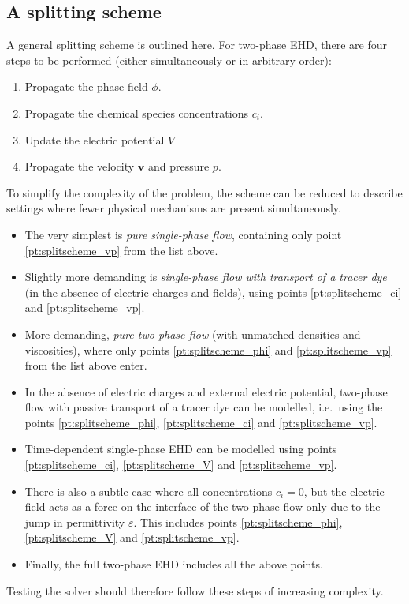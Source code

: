 \documentclass[preprint,pre,superscriptaddress,a4paper]{revtex4-1}
\renewcommand{\v}[1]{\ensuremath{\mathbf{#1}}} %
\begin{document}
\subsection{A splitting scheme}
A general splitting scheme is outlined here.
For two-phase EHD, there are four steps to be performed (either simultaneously or in arbitrary order):
\begin{enumerate}
\item Propagate the phase field $\phi$. \label{pt:splitscheme_phi}
\item Propagate the chemical species concentrations $c_i$. \label{pt:splitscheme_ci}
\item Update the electric potential $V$ \label{pt:splitscheme_V}
\item Propagate the velocity $\v v$ and pressure $p$. \label{pt:splitscheme_vp}
\end{enumerate}
To simplify the complexity of the problem, the scheme can be reduced to describe settings where fewer physical mechanisms are present simultaneously.
\begin{itemize}
\item The very simplest is \emph{pure single-phase flow}, containing only point \ref{pt:splitscheme_vp} from the list above.
\item Slightly more demanding is \emph{single-phase flow with transport of a tracer dye} (in the absence of electric charges and fields), using points \ref{pt:splitscheme_ci} and \ref{pt:splitscheme_vp}.
\item More demanding, \emph{pure two-phase flow} (with unmatched densities and viscosities), where only points \ref{pt:splitscheme_phi} and \ref{pt:splitscheme_vp} from the list above enter.
\item In the absence of electric charges and external electric potential, two-phase flow with passive transport of a tracer dye can be modelled, i.e.~using the points \ref{pt:splitscheme_phi}, \ref{pt:splitscheme_ci} and \ref{pt:splitscheme_vp}.
\item Time-dependent single-phase EHD can be modelled using points \ref{pt:splitscheme_ci}, \ref{pt:splitscheme_V} and \ref{pt:splitscheme_vp}.
\item There is also a subtle case where all concentrations $c_i = 0$, but the electric field acts as a force on the interface of the two-phase flow only due to the jump in permittivity $\varepsilon$.
  This includes points \ref{pt:splitscheme_phi}, \ref{pt:splitscheme_V} and \ref{pt:splitscheme_vp}.
\item Finally, the full two-phase EHD includes all the above points.
\end{itemize}
Testing the solver should therefore follow these steps of increasing complexity.
\end{document}
